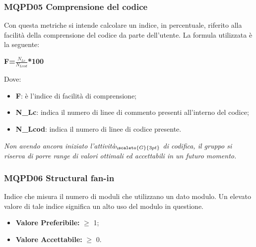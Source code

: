 \subsubsection{MQPD05 Comprensione del codice}\label{QualitàDelProdottoManutenibilitàMetricheMQPD05}
Con questa metriche si intende calcolare un indice, in percentuale, riferito alla facilità della comprensione del codice da parte dell'utente.
La formula utilizzata è la seguente:
\begin{center}
	\textbf{F=$\frac{N_{Lc}}{N_{Lcod}}$*100}
\end{center}
Dove:
\begin{itemize}
	\item \textbf{F}: è l'indice di facilità di comprensione;
	\item \textbf{N\_{Lc}}: indica il numero di linee di commento presenti all'interno del codice;
	\item \textbf{N\_{Lcod}}: indica il numero di linee di codice presente.
\end{itemize}

\textit{Non avendo ancora iniziato l'attività$_{\scaleto{G}{3pt}}$ di codifica, il gruppo si riserva di porre range di valori ottimali ed accettabili in un futuro momento.}

\subsubsection{MQPD06 Structural fan-in} \label{QualitàDelProdottoManutenibilitàMetricheMQPD06}
Indice che misura il numero di moduli che utilizzano un dato modulo. Un elevato valore di tale indice significa un alto uso del modulo in questione. 
\begin{itemize}
	\item \textbf{Valore Preferibile:} $\geq$ 1;
	\item \textbf{Valore  Accettabile:} $\geq$ 0.
\end{itemize}